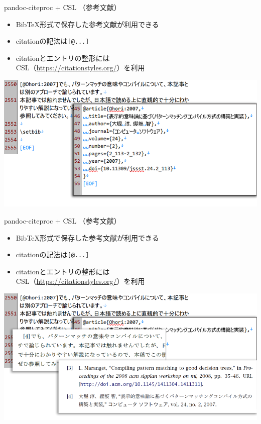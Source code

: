 \documentclass[14pt,dvipdfmx,uplatex]{beamer}
\begin{document}
\begin{frame}[t]{\inhibitglue pandoc-citeproc + CSL （参考文献）}
  \sffamily
  \begin{itemize}
    \item Bib\TeX{}形式で保存した参考文献が利用できる
    \item citationの記法は\texttt{[@...]}
    \item citationとエントリの整形には\\ CSL（{\footnotesize\url{https://citationstyles.org/}}）を利用
  \end{itemize}
  \begin{center}
  \includegraphics[width=.9\textwidth]{figures/citeproc.png}\\
  \end{center}
\end{frame}

\begin{frame}[t]{\inhibitglue pandoc-citeproc + CSL （参考文献）}
  \sffamily
  \begin{itemize}
    \item Bib\TeX{}形式で保存した参考文献が利用できる
    \item citationの記法は\texttt{[@...]}
    \item citationとエントリの整形には\\ CSL（{\footnotesize\url{https://citationstyles.org/}}）を利用
  \end{itemize}
  \begin{center}
  \includegraphics[width=.9\textwidth]{figures/citeproc2.png}\\
  \end{center}
\end{frame}
\end{document}
